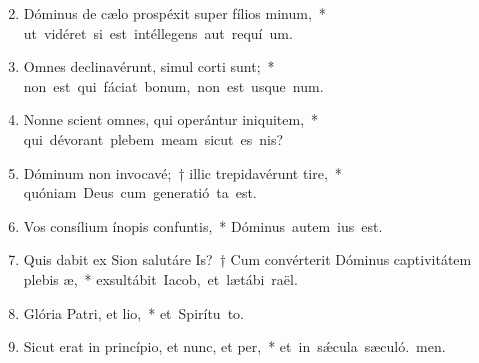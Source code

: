 \begin{flushleft}
\begin{enumerate}[leftmargin=*]
\setcounter{enumi}{1}


\item Dóminus de cælo prospéxit super fílios minum,~* \mbox{ut vidéret si est intéllegens aut requí um.}

\item Omnes declinavérunt, simul corti sunt;~* \mbox{non est qui fáciat bonum, non est usque  num.}

\item Nonne scient omnes, qui operántur iniquitem,~* \mbox{qui dévorant plebem meam sicut es nis?}

\item Dóminum non invocavé;~† illic trepidavérunt tire,~* \mbox{quóniam Deus cum generatió ta est.}

\item Vos consílium ínopis confuntis,~* \mbox{Dóminus autem  ius est.}

\item Quis dabit ex Sion salutáre Is?~† Cum convérterit Dóminus captivitátem plebis æ,~* \mbox{exsultábit Iacob, et lætábi raël.}

\item Glória Patri, et lio,~* \mbox{et Spirítu to.}

\item Sicut erat in princípio, et nunc, et per,~* \mbox{et in s\'{\ae}cula sæculó. men.}

\end{enumerate}
\end{flushleft}

